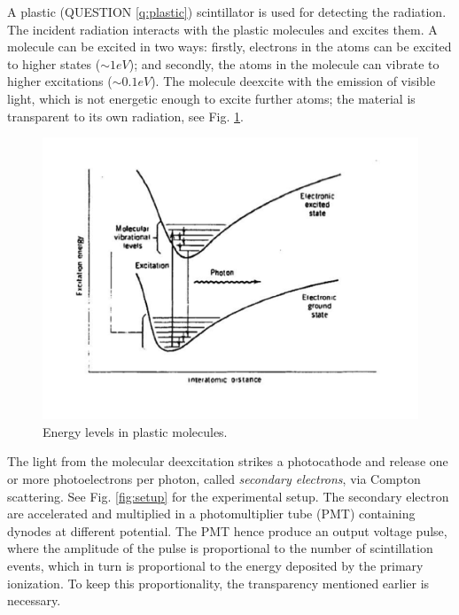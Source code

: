\documentclass[a4,11pt, notitlepage]{article}
\begin{document}
A plastic (QUESTION \ref{q:plastic}) scintillator is used for detecting the radiation. The incident radiation interacts with the plastic molecules and excites them. A molecule can be excited in two ways: firstly, electrons in the atoms can be excited to higher states ($\sim 1 eV$); and secondly, the atoms in the molecule can vibrate to higher excitations ($\sim 0.1 eV$). The molecule deexcite with the emission of visible light, which is not energetic enough to excite further atoms; the material is transparent to its own radiation, see Fig. \ref{fig:mol}. 

\vspace{-40pt}
\begin{figure}[htp]
  \vspace{40pt}
  \begin{center}
    \includegraphics[width=15.0cm]{figures/Energy.png}
    \caption{Energy levels in plastic molecules.}
\label{fig:mol}
  \end{center}
\end{figure}


The light from the molecular deexcitation strikes a photocathode and release one or more photoelectrons per photon, called \textit{secondary electrons}, via Compton scattering. See Fig. \ref{fig:setup} for the experimental setup. The secondary electron are accelerated and multiplied in a photomultiplier tube (PMT) containing dynodes at different potential. The PMT hence produce an output voltage pulse, where the amplitude of the pulse is proportional to the number of scintillation events, which in turn is proportional to the energy deposited by the primary ionization. To keep this proportionality, the transparency mentioned earlier is necessary.  
\end{document}

